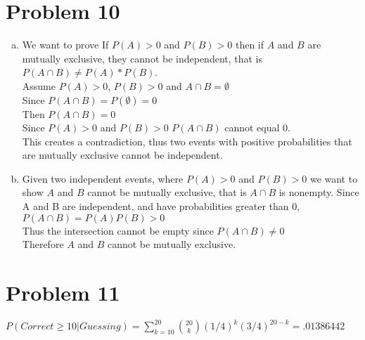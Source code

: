 \documentclass{article}
\begin{document}
\begin{flushleft}
\section*{Problem 10}
\begin{enumerate}[(a)]
\item
We want to prove If $P(A)>0$ and $P(B)>0$ then if $A$ and $B$ are mutually exclusive, they cannot be independent, that is $P(A\cap B)\neq P(A)*P(B)$.\\
Assume $P(A)>0$, $P(B)>0$ and $A\cap B=\emptyset$\\
Since $P(A\cap B)=P(\emptyset)=0$\\
Then $P(A\cap B)=0$\\
Since $P(A)>0$ and $P(B)>0$ $P(A\cap B)$ cannot equal 0.\\
This creates a contradiction, thus two events with positive probabilities that are mutually exclusive cannot be independent.
\item 
Given two independent events, where $P(A)>0$ and $P(B)>0$ we want to show $A$ and $B$ cannot be mutually exclusive, that is $A\cap B$ is nonempty.
Since A and B are independent, and have probabilities greater than 0, $P(A\cap B)=P(A)P(B)>0$\\
Thus the intersection cannot be empty since $P(A\cap B)\neq 0$\\
Therefore $A$ and $B$ cannot be mutually exclusive.
\end{enumerate}
\pagebreak
\section*{Problem 11}
$P(Correct\geq 10|Guessing)=\sum_{k=10}^{20}{20\choose k}(1/4)^k(3/4)^{20-k}=.01386442$

\end{flushleft}
\end{document}

